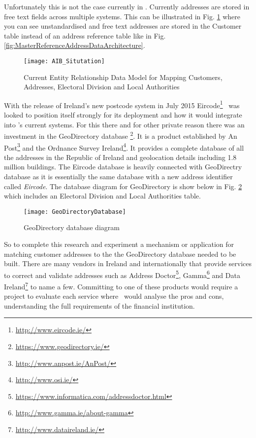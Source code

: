Unfortunately this is not the case currently in \subjectname. Currently addresses are stored in free text fields across multiple systems. This can be illustrated in Fig. \ref{fig:AIB_Situtation} where you can see unstandardised and free text addresses are stored in the Customer table instead of an address reference table like in Fig. \ref{fig:MasterReferenceAddressDataArchitecture}.

\begin{figure}[H]
	\texttt{[image: AIB\_Situtation]}
	\caption{Current Entity Relationship Data Model for Mapping Customers, Addresses, Electoral Division and Local Authorities}
	\label{fig:AIB_Situtation}
\end{figure}

With the release of Ireland's new postcode system in July 2015 Eircode\footnote{\url{http://www.eircode.ie/}} \subjectname\ was looked to position itself strongly for its deployment and how it would integrate into \subjectname's current systems. For this there and for other private reason there was an investment in the GeoDirectory database \footnote{\url{https://www.geodirectory.ie/}}. It is a product established by An Post\footnote{\url{http://www.anpost.ie/AnPost/}} and the Ordnance Survey Ireland\footnote{\url{http://www.osi.ie/}}. It provides a complete database of all the addresses in the Republic of Ireland and geolocation details including 1.8 million buildings. The Eircode database is heavily connected with GeoDirectry database as it is essentially the same database with a new address identifier called \textit{Eircode}. The database diagram for GeoDirectory is show below in Fig. \ref{fig:GeoDirectoryDatabase} which includes an Electoral Division and Local Authorities table.

\begin{figure}[H]
	\texttt{[image: GeoDirectoryDatabase]}
	\caption{GeoDirectory database diagram}
	\label{fig:GeoDirectoryDatabase}
\end{figure}

So to complete this research and experiment a mechanism or application for matching customer addresses to the the GeoDirectory database needed to be built. There are many vendors in Ireland and internationally that provide services to correct and validate addresses such as Address Doctor\footnote{\url{https://www.informatica.com/addressdoctor.html}}, Gamma\footnote{\url{http://www.gamma.ie/about-gamma}} and Data Ireland\footnote{\url{http://www.dataireland.ie/}} to name a few. Committing to one of these products would require a project to evaluate each service where \subjectname\ would analyse the pros and cons, understanding the full requirements of the financial institution.

